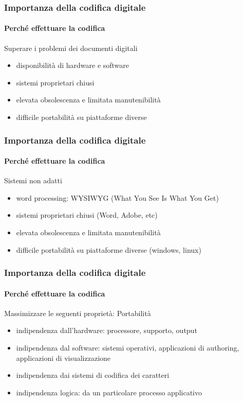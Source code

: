 \begin{frame}
	\frametitle{Importanza della codifica digitale}
	\framesubtitle{Perché effettuare la codifica}
	\addtocounter{nframe}{1}

	\begin{block}{Superare i problemi dei documenti digitali}
		\begin{itemize}
            \item disponibilità di hardware e software
            \item sistemi proprietari chiusi
            \item elevata obsolescenza e limitata manutenibilità
            \item difficile portabilità su piattaforme diverse
        \end{itemize}
	\end{block}
	
\end{frame}

\begin{frame}
	\frametitle{Importanza della codifica digitale}
	\framesubtitle{Perché effettuare la codifica}
	\addtocounter{nframe}{1}

	\begin{block}{Sistemi non adatti}
		\begin{itemize}
            \item word processing: WYSIWYG (What You See Is What You Get)
            \item sistemi proprietari chiusi (Word, Adobe, etc)
            \item elevata obsolescenza e limitata manutenibilità
            \item difficile portabilità su piattaforme diverse (windows, linux)
        \end{itemize}
	\end{block}
	
\end{frame}

\begin{frame}
	\frametitle{Importanza della codifica digitale}
	\framesubtitle{Perché effettuare la codifica}
	\addtocounter{nframe}{1}

	\begin{block}{Massimizzare le seguenti proprietà: Portabilità}
		\begin{itemize}
            \item indipendenza dall’hardware: processore, supporto, output
            \item indipendenza dal software: sistemi operativi, applicazioni di authoring, applicazioni di visualizzazione
            \item indipendenza dai sistemi di codifica dei caratteri
            \item indipendenza logica: da un particolare processo applicativo
        \end{itemize}
	\end{block}
	
\end{frame}




